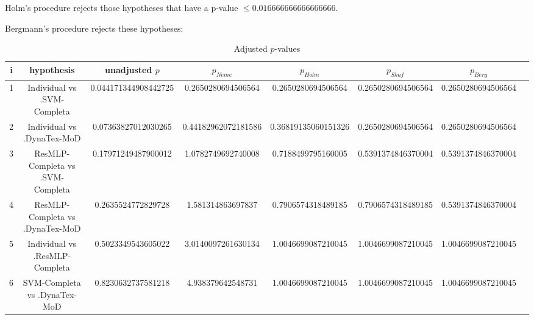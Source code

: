 \documentclass[a4paper,10pt]{article}
\begin{document}
\begin{landscape}
Holm's procedure rejects those hypotheses that have a p-value $\le0.016666666666666666$.


Bergmann's procedure rejects these hypotheses:


\begin{itemize}


\end{itemize}


\begin{table}[!htp]
\centering\tiny
\caption{Adjusted $p$-values}
\begin{tabular}{cccccccc}
i&hypothesis&unadjusted $p$&$p_{Neme}$&$p_{Holm}$&$p_{Shaf}$&$p_{Berg}$\\
\hline
1&Individual vs .SVM-Completa&0.044171344908442725&0.2650280694506564&0.2650280694506564&0.2650280694506564&0.2650280694506564\\
2&Individual vs .DynaTex-MoD&0.07363827012030265&0.44182962072181586&0.36819135060151326&0.2650280694506564&0.2650280694506564\\
3&ResMLP-Completa vs .SVM-Completa&0.17971249487900012&1.0782749692740008&0.7188499795160005&0.5391374846370004&0.5391374846370004\\
4&ResMLP-Completa vs .DynaTex-MoD&0.2635524772829728&1.581314863697837&0.7906574318489185&0.7906574318489185&0.5391374846370004\\
5&Individual vs .ResMLP-Completa&0.5023349543605022&3.0140097261630134&1.0046699087210045&1.0046699087210045&1.0046699087210045\\
6&SVM-Completa vs .DynaTex-MoD&0.8230632737581218&4.938379642548731&1.0046699087210045&1.0046699087210045&1.0046699087210045\\
\hline
\end{tabular}
\end{table}

\end{landscape}
\end{document}
